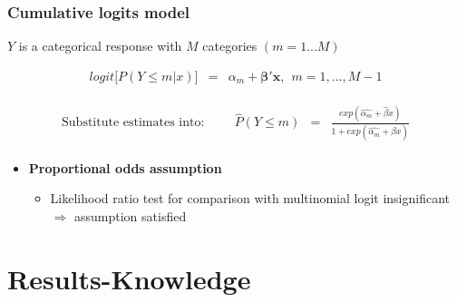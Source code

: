 \documentclass{beamer}              %
\begin{document}
\begin{frame}

\frametitle{Cumulative logits model}\label{Results-Logit2} 

 $Y$ is a categorical response with $M$ categories $(m=1...M)$

\begin{equation}\label{PCumLog}
\begin{array}{lclcl}
logit  \big[P( Y \leq m| x) \big] &=& \alpha_m + \boldsymbol{\beta'x}, ~~m=1,...,M-1
\end{array}
\end{equation}

\begin{align*}\label{Stickin}
\begin{array}{lcl}
\text{Substitute estimates into:} \hspace{1cm}\hat{P}(Y\leq m) &=& \frac{exp(\hat{\alpha_m}+ \hat{\beta} x)}{1+exp(\hat{\alpha_m}+ \hat{\beta} x)}
\end{array}
\end{align*}

\vspace{0.5cm}
\begin{itemize}
\item \textbf{Proportional odds assumption}
\begin{itemize}
\item Likelihood ratio test for comparison with multinomial logit insignificant $\boldsymbol{\Rightarrow}$ assumption satisfied

\end{itemize}

\end{itemize}

\end{frame}














\section{Results-Knowledge}\label{Results-Knowledge}
\end{document}
